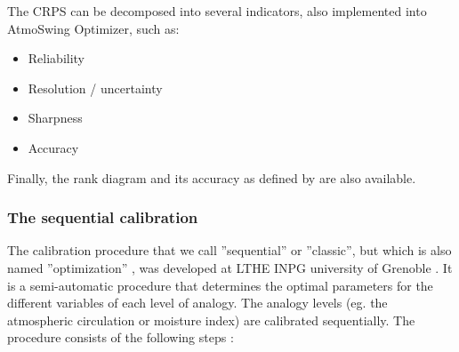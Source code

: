 \documentclass[review]{elsarticle}
\begin{document}
The CRPS can be decomposed into several indicators, also implemented into AtmoSwing Optimizer, such as:

\begin{itemize}
	\setlength\itemsep{-1mm}
	\item Reliability \citep{Hersbach2000}
	\item Resolution / uncertainty \citep{Hersbach2000}
	\item Sharpness \citep{Bontron2004}
	\item Accuracy \citep{Bontron2004}
\end{itemize}

Finally, the rank diagram \citep{Talagrand1997} and its accuracy as defined by \citet{Candille2005} are also available.


\subsubsection{The sequential calibration}
\label{sec:atmoswing-calibration}

The calibration procedure that we call ''sequential'' or ''classic'', but which is also named ''optimization'' \cite[eg. by ][]{BenDaoud2015}, was developed at LTHE \textendash INPG university of Grenoble \citep{Bontron2004}. It is a semi-automatic procedure that determines the optimal parameters for the different variables of each level of analogy. The analogy levels (eg. the atmospheric circulation or moisture index) are calibrated sequentially. The procedure consists of the following steps \citep{Bontron2004}:
\end{document}
